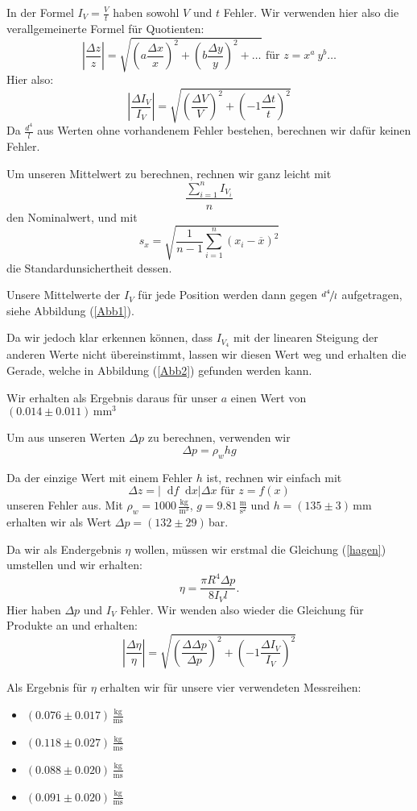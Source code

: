 \documentclass[11pt,a4paper]{article}
\newcommand\dif{\mathop{}\!\mathrm{d}}
\begin{document}
In der Formel $I_V=\frac{V}{t}$ haben sowohl $V$ und $t$ Fehler. Wir verwenden hier also die verallgemeinerte Formel f\"ur Quotienten:
$$
\left\vert\frac{\Delta z}{z}\right\vert=\sqrt{\left(a\frac{\Delta x}{x}\right)^2+\left(b\frac{\Delta y}{y}\right)^2+\ldots}\textrm{ f\"ur }z=x^a\ y^b\ldots
$$
Hier also:
$$
\left\vert\frac{\Delta I_V}{I_V}\right\vert=\sqrt{\left(\frac{\Delta V}{V}\right)^2+\left(-1\frac{\Delta t}{t}\right)^2}
$$
Da $\frac{d^4}{l}$ aus Werten ohne vorhandenem Fehler bestehen, berechnen wir daf\"ur keinen Fehler.

Um unseren Mittelwert zu berechnen, rechnen wir ganz leicht mit 
$$
\frac{\sum_{i=1}^n I_{V_i}}{n}
$$
den Nominalwert, und mit
$$
s_x=\sqrt{\frac{1}{n-1}\sum_{i=1}^n(x_i-\overline{x})^2}
$$
die Standardunsichertheit dessen.

Unsere Mittelwerte der $I_V$ f\"ur jede Position werden dann gegen $\nicefrac{d^4}{l}$ aufgetragen, siehe Abbildung (\ref{Abb1}).

Da wir jedoch klar erkennen k\"onnen, dass $I_{V_4}$ mit der linearen Steigung der anderen Werte nicht \"ubereinstimmt, lassen wir diesen Wert weg und erhalten die Gerade, welche in Abbildung (\ref{Abb2}) gefunden werden kann.

Wir erhalten als Ergebnis daraus f\"ur unser $a$ einen Wert von $(0.014\pm0.011)\,\mathrm{mm}^3$

Um aus unseren Werten $\Delta p$ zu berechnen, verwenden wir
$$
\Delta p=\rho_w hg
$$

Da der einzige Wert mit einem Fehler $h$ ist, rechnen wir einfach mit
$$
\Delta z=\left|{\dif f}{\dif x}\right|\Delta x\textrm{ f\"ur }z=f(x)
$$
unseren Fehler aus.
Mit $\rho_w=1000\,\frac{\mathrm{kg}}{\mathrm{m}^3}$, $g=9.81\,\frac{\mathrm{m}}{\mathrm{s}^2}$ und $h=(135\pm3)\,\mathrm{mm}$ erhalten wir als Wert $\Delta p=(132\pm29)\,$bar.

Da wir als Endergebnis $\eta$ wollen, m\"ussen wir erstmal die Gleichung (\ref{hagen}) umstellen und wir erhalten:
$$
\eta=\frac{\pi R^4\Delta p}{8I_V l}.
$$
Hier haben $\Delta p$ und $I_V$ Fehler. Wir wenden also wieder die Gleichung f\"ur Produkte an und erhalten:
$$
\left\vert\frac{\Delta\eta}{\eta}\right\vert=\sqrt{\left(\frac{\Delta\Delta p}{\Delta p}\right)^2+\left(-1\frac{\Delta I_V}{I_V}\right)^2}
$$

Als Ergebnis f\"ur $\eta$ erhalten wir f\"ur unsere vier verwendeten Messreihen:
\begin{itemize}
\item $(0.076\pm0.017)\,\mathrm{\frac{kg}{ms}}$
\item $(0.118\pm0.027)\,\mathrm{\frac{kg}{ms}}$
\item $(0.088\pm0.020)\,\mathrm{\frac{kg}{ms}}$
\item $(0.091\pm0.020)\,\mathrm{\frac{kg}{ms}}$
\end{itemize}
\end{document}
